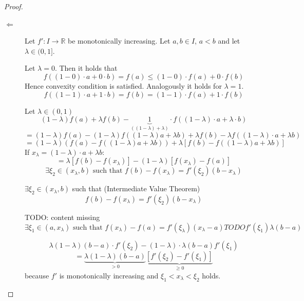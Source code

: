 \documentclass[a4paper,landscape,twocolumn]{article}
\theoremstyle{definition}
\begin{document}
\begin{proof}
  \begin{description}
    \item[$\Leftarrow$]
      Let $f': I \to \mathbb R$ be monotonically increasing. Let $a,b \in I$,
      $a < b$ and let $\lambda \in (0, 1]$.

      Let $\lambda = 0$. Then it holds that
      \[ f((1 - 0) \cdot a + 0 \cdot b) = f(a) \leq (1 - 0) \cdot f(a) + 0 \cdot f(b) \]
      Hence convexity condition is satisfied. Analogously it holds for $\lambda = 1$.
      \[ f((1 - 1) \cdot a + 1 \cdot b) = f(b) = (1 - 1) \cdot f(a) + 1 \cdot f(b) \]

      Let $\lambda \in (0,1)$
      \[
        (1 - \lambda) f(a) + \lambda f(b) - \underbrace{1}_{((1 - \lambda) + \lambda)}
        \cdot f((1 - \lambda) \cdot a + \lambda \cdot b)
      \] \[
        = (1 - \lambda) f(a) - (1 - \lambda) f((1 - \lambda) a + \lambda b)
        + \lambda f(b) - \lambda f((1 - \lambda) \cdot a + \lambda b)
      \] \[
        = (1 - \lambda) \left(f(a) - f\left((1 - \lambda) a + \lambda b\right)\right)
        + \lambda \left[f(b) - f((1 - \lambda) a + \lambda b)\right]
      \]
      If $x_\lambda = (1 - \lambda) \cdot a + \lambda b$:
      \[
        = \lambda [f(b) - f(x_\lambda)] - (1 - \lambda) [f(x_\lambda) - f(a)]
      \] \[
        \exists \xi_2 \in (x_\lambda, b) \text{ such that }
        f(b) - f(x_\lambda) = f'(\xi_2) (b - x_\lambda)
      \]

      $\exists \xi_2 \in (x_\lambda, b)$ such that (Intermediate Value Theorem)
      \[ f(b) - f(x_\lambda) = f'(\xi_2) (b - x_\lambda) \]

      TODO: content missing
      \[
        \exists \xi_1 \in (a, x_\lambda) \text{ such that }
        f(x_\lambda) - f(a) = f'(\xi_\lambda) (x_\lambda - a)
        TODO
        f'(\xi_1) \lambda (b - a)
      \]

      \[ \lambda (1 - \lambda) (b - a) \cdot f'(\xi_2) - (1 - \lambda) \cdot \lambda (b - a) f'(\xi_1) \]
      \[ = \underbrace{\lambda (1 - \lambda) (b - a)}_{>0} \underbrace{\left[f'(\xi_2) - f'(\xi_1)\right]}_{\geq 0} \]
      because $f'$ is monotonically increasing and
      $\xi_1 < x_\lambda < \xi_2$ holds.


\end{description}
\end{proof}
\end{document}
